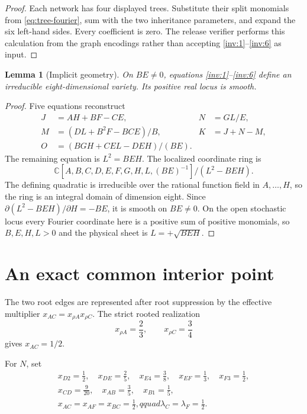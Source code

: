 \documentclass[11pt]{article}
\newtheorem{lemma}[theorem]{Lemma}
\theoremstyle{remark}
\newcommand{\C}{\mathbb C}
\begin{document}
\begin{proof}
Each network has four displayed trees.  Substitute their split monomials
from \eqref{eq:tree-fourier}, sum with the two inheritance parameters, and
expand the six left-hand sides.  Every coefficient is zero.  The release
verifier performs this calculation from the graph encodings rather than
accepting \eqref{inv:1}--\eqref{inv:6} as input.
\end{proof}

\begin{lemma}[Implicit geometry]\label{lem:geometry}
On $BE\ne0$, equations \eqref{inv:1}--\eqref{inv:6} define an irreducible
eight-dimensional variety.  Its positive real locus is smooth.
\end{lemma}

\begin{proof}
Five equations reconstruct
\begin{align}
J&=AH+BF-CE,&
N&=GL/E,\\
M&=(DL+B^2F-BCE)/B,&
K&=J+N-M,\\
O&=(BGH+CEL-DEH)/(BE).
\label{eq:reconstruction}
\end{align}
The remaining equation is $L^2=BEH$.  The localized coordinate ring is
\[
\C[A,B,C,D,E,F,G,H,L,(BE)^{-1}]/(L^2-BEH).
\]
The defining quadratic is irreducible over the rational function field in
$A,\ldots,H$, so the ring is an integral domain of dimension eight.  Since
$\partial(L^2-BEH)/\partial H=-BE$, it is smooth on $BE\ne0$.  On the open
stochastic locus every Fourier coordinate here is a positive sum of positive
monomials, so $B,E,H,L>0$ and the physical sheet is
$L=+\sqrt{BEH}$.
\end{proof}

\section{An exact common interior point}

The two root edges are represented after root suppression by the effective
multiplier $x_{AC}=x_{\rho A}x_{\rho C}$.  The strict rooted realization
\[
x_{\rho A}=\frac23,\qquad x_{\rho C}=\frac34
\]
gives $x_{AC}=1/2$.

For $N$, set
\begin{equation}\label{eq:source-point}
\begin{gathered}
x_{D2}=\frac12,\quad x_{DE}=\frac25,\quad x_{E4}=\frac38,
\quad x_{EF}=\frac13,\quad x_{F3}=\frac12,\\
x_{CD}=\frac9{20},\quad x_{AB}=\frac35,\quad x_{B1}=\frac15,\\
x_{AC}=x_{AF}=x_{BC}=\frac12,qquad
\lambda_C=\lambda_F=\frac12.
\end{gathered}
\end{equation}
\end{document}

